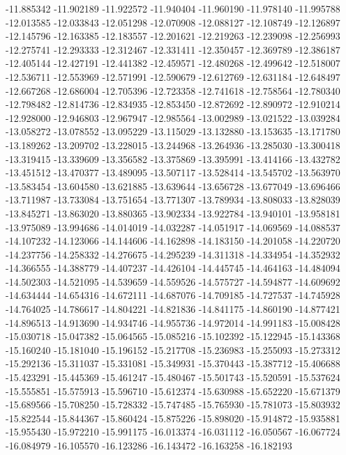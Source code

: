 -11.885342
-11.902189
-11.922572
-11.940404
-11.960190
-11.978140
-11.995788
-12.013585
-12.033843
-12.051298
-12.070908
-12.088127
-12.108749
-12.126897
-12.145796
-12.163385
-12.183557
-12.201621
-12.219263
-12.239098
-12.256993
-12.275741
-12.293333
-12.312467
-12.331411
-12.350457
-12.369789
-12.386187
-12.405144
-12.427191
-12.441382
-12.459571
-12.480268
-12.499642
-12.518007
-12.536711
-12.553969
-12.571991
-12.590679
-12.612769
-12.631184
-12.648497
-12.667268
-12.686004
-12.705396
-12.723358
-12.741618
-12.758564
-12.780340
-12.798482
-12.814736
-12.834935
-12.853450
-12.872692
-12.890972
-12.910214
-12.928000
-12.946803
-12.967947
-12.985564
-13.002989
-13.021522
-13.039284
-13.058272
-13.078552
-13.095229
-13.115029
-13.132880
-13.153635
-13.171780
-13.189262
-13.209702
-13.228015
-13.244968
-13.264936
-13.285030
-13.300418
-13.319415
-13.339609
-13.356582
-13.375869
-13.395991
-13.414166
-13.432782
-13.451512
-13.470377
-13.489095
-13.507117
-13.528414
-13.545702
-13.563970
-13.583454
-13.604580
-13.621885
-13.639644
-13.656728
-13.677049
-13.696466
-13.711987
-13.733084
-13.751654
-13.771307
-13.789934
-13.808033
-13.828039
-13.845271
-13.863020
-13.880365
-13.902334
-13.922784
-13.940101
-13.958181
-13.975089
-13.994686
-14.014019
-14.032287
-14.051917
-14.069569
-14.088537
-14.107232
-14.123066
-14.144606
-14.162898
-14.183150
-14.201058
-14.220720
-14.237756
-14.258332
-14.276675
-14.295239
-14.311318
-14.334954
-14.352932
-14.366555
-14.388779
-14.407237
-14.426104
-14.445745
-14.464163
-14.484094
-14.502303
-14.521095
-14.539659
-14.559526
-14.575727
-14.594877
-14.609692
-14.634444
-14.654316
-14.672111
-14.687076
-14.709185
-14.727537
-14.745928
-14.764025
-14.786617
-14.804221
-14.821836
-14.841175
-14.860190
-14.877421
-14.896513
-14.913690
-14.934746
-14.955736
-14.972014
-14.991183
-15.008428
-15.030718
-15.047382
-15.064565
-15.085216
-15.102392
-15.122945
-15.143368
-15.160240
-15.181040
-15.196152
-15.217708
-15.236983
-15.255093
-15.273312
-15.292136
-15.311037
-15.331081
-15.349931
-15.370443
-15.387712
-15.406688
-15.423291
-15.445369
-15.461247
-15.480467
-15.501743
-15.520591
-15.537624
-15.555851
-15.575913
-15.596710
-15.612374
-15.630988
-15.652220
-15.671379
-15.689566
-15.708250
-15.728332
-15.747485
-15.765930
-15.781073
-15.803932
-15.822544
-15.844367
-15.860424
-15.875226
-15.898020
-15.914872
-15.935881
-15.955430
-15.972210
-15.991175
-16.013374
-16.031112
-16.050567
-16.067724
-16.084979
-16.105570
-16.123286
-16.143472
-16.163258
-16.182193
